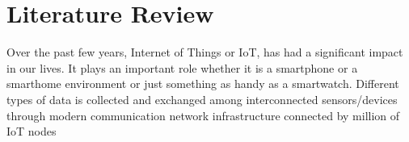 \chapter{Literature Review}
Over the past few years, Internet of Things or IoT, has had a significant impact in our lives.
It plays an important role whether it is a smartphone or a smarthome environment or just something 
as handy as a smartwatch. Different types of data is collected and exchanged among interconnected 
sensors/devices through modern communication network infrastructure connected by million of 
IoT nodes \cite{8123913,7598173,7879243,6774858,10.1145/2872332}

